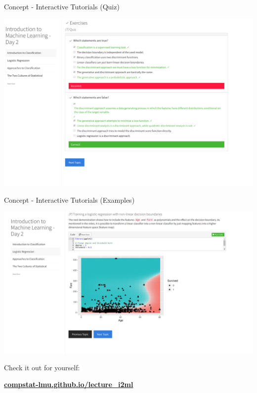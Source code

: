 \documentclass[10pt]{beamer}
\begin{document}
\begin{frame}{Concept - Interactive Tutorials (Quiz)}

  \begin{center}
  \includegraphics[width=\textwidth]{figures/iml_tut0.png}
  \end{center}

\end{frame}

\begin{frame}{Concept - Interactive Tutorials (Examples)}

  \begin{center}
  \includegraphics[width=\textwidth]{figures/iml_tut1.png}
  \end{center}

\end{frame}

\begin{frame}

\LARGE{Check it out for yourself:}

\Large{\textbf{\url{compstat-lmu.github.io/lecture_i2ml}}}

\end{frame}
\end{document}
